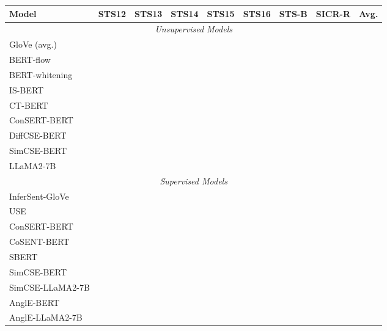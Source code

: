 \documentclass{article} \usepackage{iclr2024_conference,times}
\begin{document}
\begin{table*}[ht]
\small
\centering
\begin{threeparttable}
\begin{tabular}{lcccccccc}
\toprule
Model & STS12 & STS13 & STS14 & STS15 & STS16 & STS-B & SICR-R & Avg. \\

\midrule
\midrule
\multicolumn{9}{c}{\textit{Unsupervised Models}} \\

\midrule
GloVe (avg.)  &  &  &   &   &   &    &  &  \\ 
BERT-flow  &  &  &   &   &   &    &  &  \\
BERT-whitening  &  &  &   &   &   &    &  &  \\
IS-BERT  &  &  &  &  &  &  &  &  \\
CT-BERT  &  &  &  &  &  &  &  &  \\
ConSERT-BERT &  &  &  &  &  &  &  &  \\
DiffCSE-BERT &  &  &  &  &  &  &  &  \\
SimCSE-BERT  &  &  &  &  &  &  &  &  \\
LLaMA2-7B  &  &  &  &  &  &  &  &  \\

\midrule
\midrule
\multicolumn{9}{c}{\textit{Supervised Models}} \\
\midrule

InferSent-GloVe   &  &  &  &  &  &  &  &  \\
USE  &  &  &  &  &  &  &  &  \\
ConSERT-BERT &  &  &  &  &  &  &  &  \\
CoSENT-BERT  &  &  &  &  &  &  &  &  \\
SBERT  &  &  &  &  &  &  &  &  \\
SimCSE-BERT &  &  &  &  &  &  &  &  \\





SimCSE-LLaMA2-7B  &  &  &  &  &  &  &  &  \\ 

\midrule
AnglE-BERT &  &  &  &  &  &  &  &  \\



AnglE-LLaMA2-7B &  &  &  &  &  &  &  &  \\ 








\end{tabular}
\end{threeparttable}
\end{table*}
\end{document}
